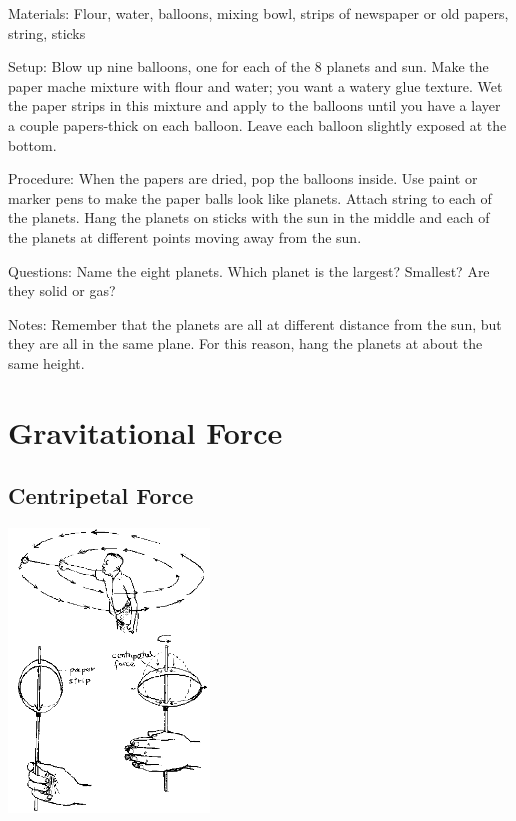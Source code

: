 \begin{multicols}{2}
\begin{description*}
\item[Materials:]{Flour, water, balloons, mixing bowl, strips of newspaper or old papers, string, sticks}
\item[Setup:]{Blow up nine balloons, one for each of the 8 planets and sun. Make the paper mache mixture with flour and water; you want a watery glue texture. Wet the paper strips in this mixture and apply to the balloons until you have a layer a couple papers-thick on each balloon. Leave each balloon slightly exposed at the bottom.}
\item[Procedure:]{When the papers are dried, pop the balloons inside. Use paint or marker pens to make the paper balls look like planets. Attach string to each of the planets. Hang the planets on sticks with the sun in the middle and each of the planets at different points moving away from the sun.}
\item[Questions:]{Name the eight planets. Which planet is the largest? Smallest? Are they solid or gas?}
\item[Notes:]{Remember that the planets are all at different distance from the sun, but they are all in the same plane. For this reason, hang the planets at about the same height.}
\end{description*}


\section*{Gravitational Force}


\subsection{Centripetal Force}

\begin{center}
\includegraphics[width=0.4\textwidth]{./img/source/centripetal-force.png}
\end{center}


\end{multicols}
